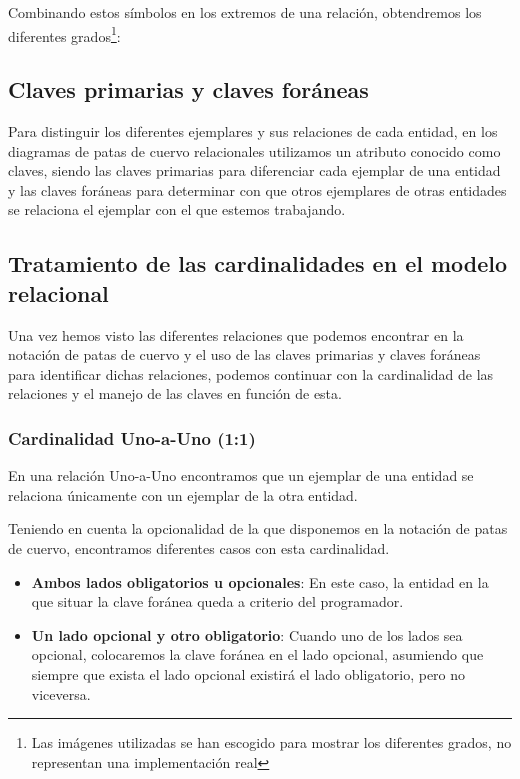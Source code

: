 Combinando estos símbolos en los extremos de una relación, obtendremos los diferentes grados\footnote{Las imágenes utilizadas se han escogido para mostrar los diferentes grados, no representan una implementación real}:

\subsection{Claves primarias y claves foráneas}
Para distinguir los diferentes ejemplares y sus relaciones de cada entidad, en los diagramas de patas de cuervo relacionales utilizamos un atributo conocido como claves, siendo las claves primarias para diferenciar cada ejemplar de una entidad y las claves foráneas para determinar con que otros ejemplares de otras entidades se relaciona el ejemplar con el que estemos trabajando.

\subsection{Tratamiento de las cardinalidades en el modelo relacional}
Una vez hemos visto las diferentes relaciones que podemos encontrar en la notación de patas de cuervo y el uso de las claves primarias y claves foráneas para identificar dichas relaciones, podemos continuar con la cardinalidad de las relaciones y el manejo de las claves en función de esta\cite{vert:cardin}.

\subsubsection{Cardinalidad Uno-a-Uno (1:1)}
En una relación Uno-a-Uno encontramos que un ejemplar de una entidad se relaciona únicamente con un ejemplar de la otra entidad.

Teniendo en cuenta la opcionalidad de la que disponemos en la notación de patas de cuervo, encontramos diferentes casos con esta cardinalidad.
\begin{itemize}
    \item \textbf{Ambos lados obligatorios u opcionales}: En este caso, la entidad en la que situar la clave foránea queda a criterio del programador.
    \item \textbf{Un lado opcional y otro obligatorio}: Cuando uno de los lados sea opcional, colocaremos la clave foránea en el lado opcional, asumiendo que siempre que exista el lado opcional existirá el lado obligatorio, pero no viceversa.
\end{itemize}


